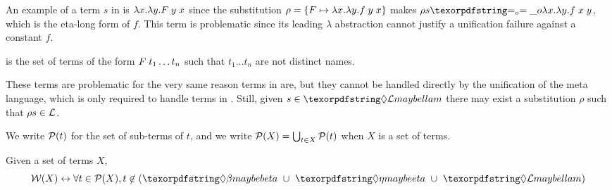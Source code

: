 \noindent
An example of a term $s$ in \maybeeta{} is
$\lambda x.\lambda y.F \appsep y \appsep x$
since the substitution
$\rho = \{ F \mapsto \lambda x.\lambda y.f \appsep y \appsep x\}$
makes $\rho s \Eo{} \lambda x.\lambda y.f \appsep x \appsep y$,
which is the eta-long form of $f$. This term is problematic since
its leading $\lambda$ abstraction cannot justify a
unification failure against a constant $f$.

\begin{definition}[\notllambda]\label{def:notllambda}
  \notllambda is the set of terms of the form $F \appsep t_1 \ldots t_n$
  such that $t_1 \ldots t_n$ are not distinct names.
\end{definition}

\noindent
These terms are problematic for the very same reason terms in \maybebeta are,
but they cannot be handled directly by the unification of the meta language, which
is only required to handle terms in \llambda. Still, given $s \in \notllambda$
there may exist a substitution $\rho$ such that $\rho s \in \mathcal{L}$.


We write $\mathcal{P}(t)$ for the set of sub-terms of $t$, and
we write $\mathcal{P}(X) = \bigcup_{t\in X} \mathcal{P}(t)$ when $X$ is a set of terms.

\begin{definition}
Given a set of terms $X$, %
$$
\wellb(X) \leftrightarrow \forall t \in \subterm{X},
t \not\in (\maybebeta{} ~\cup~ \maybeeta{} ~\cup~ \notllambda{})
$$
\end{definition}


